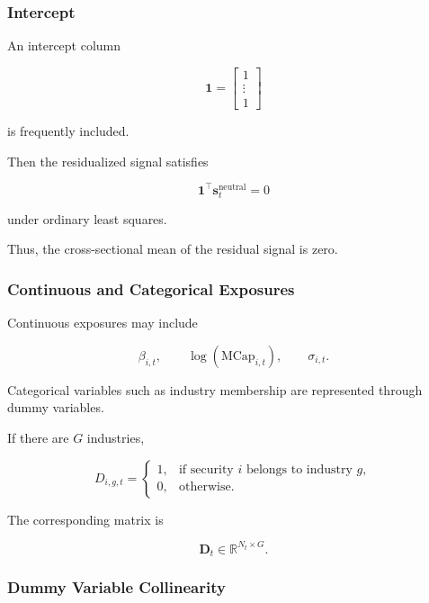 \documentclass[11pt,a4paper]{article}
\begin{document}
\subsubsection{Intercept}

An intercept column

\begin{equation}
\mathbf{1}
=
\begin{bmatrix}
1\\
\vdots\\
1
\end{bmatrix}
\end{equation}

is frequently included.

Then the residualized signal satisfies

\begin{equation}
\mathbf{1}^{\top}
\mathbf{s}_t^{\mathrm{neutral}}
=
0
\end{equation}

under ordinary least squares.

Thus, the cross-sectional mean of the residual signal is zero.


\subsubsection{Continuous and Categorical Exposures}

Continuous exposures may include

\begin{equation}
\beta_{i,t},
\qquad
\log(\mathrm{MCap}_{i,t}),
\qquad
\sigma_{i,t}.
\end{equation}

Categorical variables such as industry membership are represented through dummy
variables.

If there are $G$ industries,

\begin{equation}
D_{i,g,t}
=
\begin{cases}
1,
&
\text{if security }i\text{ belongs to industry }g,
\\
0,
&
\text{otherwise}.
\end{cases}
\end{equation}

The corresponding matrix is

\begin{equation}
\mathbf{D}_t
\in
\mathbb{R}^{N_t\times G}.
\end{equation}


\subsubsection{Dummy Variable Collinearity}
\end{document}
